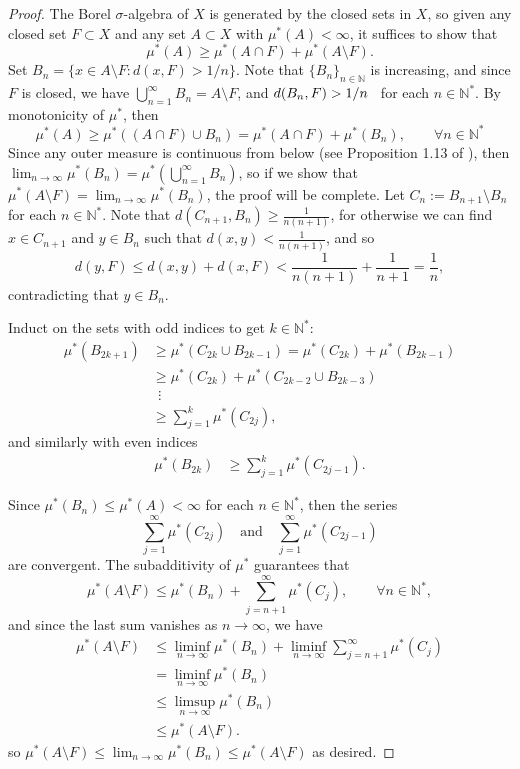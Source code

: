 \documentclass[12pt,a4paper]{report}
\theoremstyle{definition}
\begin{document}
\begin{proof}
The Borel $\sigma$-algebra of $X$ is generated by the closed sets in $X$, so given any closed set \(F \subset X\) and any set \(A \subset X\) with \(\mu^*(A) < \infty\), it suffices to show that
$$\mu^*(A) \geq \mu^*(A \cap F) + \mu^*(A \setminus F).$$
Set \(B_n = \{x \in A \setminus F : d(x, F) > 1/n\}\). Note that $\{B_n\}_{n \in \mathbb{N}}$ is increasing, and since $F$ is closed, we have $\bigcup_{n=1}^\infty B_n = A \setminus F$, and $d(B_n, F) > 1/n \hspace{0.5em}$ for each $n \in \mathbb{N^*}$. By monotonicity of $\mu^*$, then
$$\mu^*(A) \geq \mu^*((A \cap F) \cup B_n) = \mu^*(A \cap F) + \mu^*(B_n), \qquad \forall n \in \mathbb{N^*} $$
Since any outer measure is continuous from below (see Proposition 1.13 of \cite{folland1999real}), then $\lim_{n\to\infty} \mu^*(B_n) = \mu^*( \bigcup_{n=1}^\infty B_n)$, so if we show that $\mu^*(A \setminus F) = \lim_{n\to\infty} \mu^*(B_n)$, the proof will be complete. Let \( C_n := B_{n+1} \setminus B_n \) for each \( n \in \mathbb{N^*} \). Note that $d(C_{n+1}, B_n) \geq \frac{1}{n(n+1)}$, for otherwise we can find $x \in C_{n+1}$ and $y \in B_n$ such that $d(x,y) < \frac{1}{n(n+1)}$, and so
$$d(y, F) \leq d(x,y)+d(x,F) < \frac{1}{n(n+1)} + \frac{1}{n+1} = \frac{1}{n},$$
contradicting that $y \in B_n$.

Induct on the sets with odd indices to get $k \in \mathbb{N^*}$:
\begin{align*}
\mu^*(B_{2k+1})
&\geq \mu^*(C_{2k} \cup B_{2k-1}) = \mu^*(C_{2k}) + \mu^*(B_{2k-1}) \\
&\geq \mu^*(C_{2k}) + \mu^*(C_{2k-2} \cup B_{2k-3}) \\
&\ \ \vdots \\
&\geq \sum_{j=1}^k \mu^*(C_{2j}),
\end{align*}
and similarly with even indices
\begin{align*}
\mu^*(B_{2k})
&\geq \sum_{j=1}^k \mu^*(C_{2j-1}).
\end{align*}

Since $\mu^*(B_n) \leq \mu^*(A) < \infty$ for each $n \in \mathbb{N^*}$, then the series
\[
\sum_{j=1}^\infty \mu^*(C_{2j}) \quad \text{and} \quad \sum_{j=1}^\infty \mu^*(C_{2j-1})
\]
are convergent. The subadditivity of $\mu^*$ guarantees that
$$ \mu^*(A \setminus F) \leq \mu^*(B_n) + \sum_{j=n+1}^\infty \mu^*(C_j), \qquad \forall n \in \mathbb{N^*}, $$
and since the last sum vanishes as $n \to \infty$, we have
\begin{align*}
\mu^*(A \setminus F)
&\leq \liminf_{n \to \infty} \mu^*(B_n) + \liminf_{n \to \infty} \sum_{j = n+1}^\infty \mu^*(C_j) \\
&= \liminf_{n \to \infty} \mu^*(B_n) \\
&\leq \limsup_{n \to \infty} \mu^*(B_n) \\
&\leq \mu^*(A \setminus F).
\end{align*}
so
$ \mu^*(A \setminus F)
\leq \lim_{n\to\infty} \mu^*(B_n)
\leq \mu^*(A \setminus F) $
as desired.

\end{proof}
\end{document}
